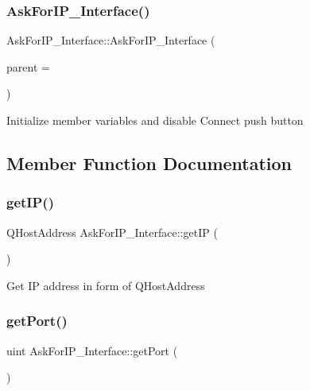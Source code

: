 \subsubsection{\texorpdfstring{Ask\+For\+I\+P\+\_\+\+Interface()}{AskForIP\_Interface()}}
{\footnotesize\ttfamily Ask\+For\+I\+P\+\_\+\+Interface\+::\+Ask\+For\+I\+P\+\_\+\+Interface (\begin{DoxyParamCaption}\item[{Q\+Widget $\ast$}]{parent = {} }\end{DoxyParamCaption})\hspace{0.3cm}{\ttfamily [explicit]}}

Initialize member variables and disable Connect push button 

\subsection{Member Function Documentation}
\mbox{\label{class_ask_for_i_p___interface_a825a41d9af858b34f2acdb187ef3c327}} 
\subsubsection{\texorpdfstring{get\+I\+P()}{getIP()}}
{\footnotesize\ttfamily Q\+Host\+Address Ask\+For\+I\+P\+\_\+\+Interface\+::get\+IP (\begin{DoxyParamCaption}{ }\end{DoxyParamCaption})\hspace{0.3cm}{\ttfamily [inline]}}

Get IP address in form of Q\+Host\+Address \mbox{\label{class_ask_for_i_p___interface_af3d49951f070582d72c125b631f8212d}} 
\subsubsection{\texorpdfstring{get\+Port()}{getPort()}}
{\footnotesize\ttfamily uint Ask\+For\+I\+P\+\_\+\+Interface\+::get\+Port (\begin{DoxyParamCaption}{ }\end{DoxyParamCaption})\hspace{0.3cm}{\ttfamily [inline]}}

